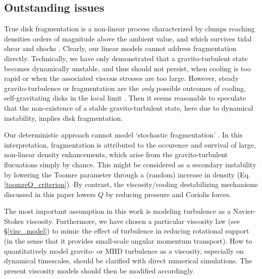 \subsection{Outstanding issues}
True disk fragmentation is a non-linear process characterized by
clumps reaching densities orders of magnitude above the ambient value, and
which survives tidal shear and shocks \citep{paardekooper12,young16}.  
Clearly, our linear models cannot address fragmentation
directly. Technically, we have only demonstrated that a 
gravito-turbulent state becomes dynamically unstable, and thus should
not persist, when cooling is too rapid or when the associated viscous
stresses are too large.  However, steady gravito-turbulence or 
fragmentation are the \emph{only} possible outcomes of cooling, 
self-gravitating disks in the local limit \citep[][]{gammie01}.    
Then it seems reasonable to speculate that the non-existence of a stable
gravito-turbulent state, here due to dynamical instability, implies
disk fragmentation.   


Our deterministic approach cannot model `stochastic fragmentation'
\citep{paardekooper12,hopkins13}. In this interpretation,  
fragmentation is attributed to the occurence and survival 
of large, non-linear density enhancements, which arise from the
gravito-turbulent flucuations simply by chance. 
This might be considered as a secondary instability by lowering the
Toomre parameter through a (random) increase in density 
(Eq. \ref{toomreQ_criterion}). By contrast, the viscosity/cooling
destabilizing mechanisms discussed in this paper lowers $Q$ by
reducing pressure and Coriolis forces. %


The most important assumption in this work is modeling turbulence as a  
Navier-Stokes viscosity. Furthermore, we have chosen a particular  
viscosity law (see \S\ref{visc_model}) to mimic the effect of 
turbulence in reducing rotational support (in the sense that it
provides small-scale angular momentum transport). 
How to quantitatively model gravito- or MHD turbulence 
as a viscosity, especially on dynamical timescales, should be 
clarified with direct numerical simulations. The present viscosity
models should then be modified accordingly. 

